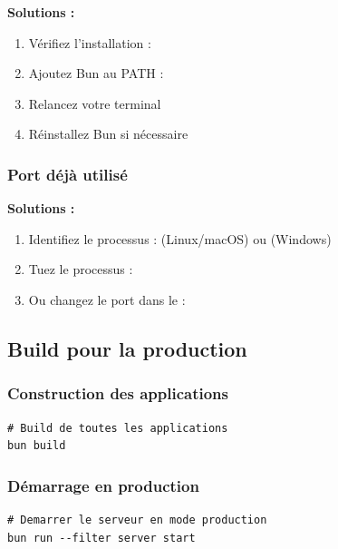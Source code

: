 \textbf{Solutions :}
\begin{enumerate}[leftmargin=*]
    \item Vérifiez l'installation : 
    \item Ajoutez Bun au PATH : 
    \item Relancez votre terminal
    \item Réinstallez Bun si nécessaire
\end{enumerate}

\subsubsection{Port déjà utilisé}

\begin{tcolorbox}[colback=red!5!white,colframe=red!75!black,title=Symptôme]
\end{tcolorbox}

\textbf{Solutions :}
\begin{enumerate}[leftmargin=*]
    \item Identifiez le processus :  (Linux/macOS) ou  (Windows)
    \item Tuez le processus : 
    \item Ou changez le port dans le  : 
\end{enumerate}

\subsection{Build pour la production}

\subsubsection{Construction des applications}

\begin{lstlisting}[language={}, frame=single]
# Build de toutes les applications
bun build
\end{lstlisting}

\subsubsection{Démarrage en production}

\begin{lstlisting}[language={}, frame=single]
# Demarrer le serveur en mode production
bun run --filter server start
\end{lstlisting}

